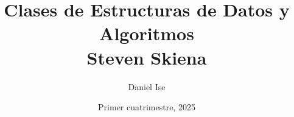 \documentclass[11pt]{article}
\title{Clases de Estructuras de Datos y Algoritmos\\Steven Skiena}
\author{Daniel Ise}
\date{Primer cuatrimestre, 2025}
\begin{document}
\maketitle

\tableofcontents

\pagebreak


\end{document}
